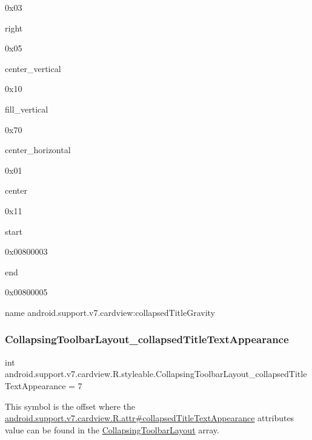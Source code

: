 0x03

{\ttfamily right}

0x05

{\ttfamily center\+\_\+vertical}

0x10

{\ttfamily fill\+\_\+vertical}

0x70

{\ttfamily center\+\_\+horizontal}

0x01

{\ttfamily center}

0x11

{\ttfamily start}

0x00800003

{\ttfamily end}

0x00800005

name android.\+support.\+v7.\+cardview\+:collapsed\+Title\+Gravity \mbox{\label{classandroid_1_1support_1_1v7_1_1cardview_1_1R_1_1styleable_ad3a48e5593ffa8db03af733e76a429f2}} 
\subsubsection{\texorpdfstring{Collapsing\+Toolbar\+Layout\+\_\+collapsed\+Title\+Text\+Appearance}{CollapsingToolbarLayout\_collapsedTitleTextAppearance}}
{\footnotesize\ttfamily int android.\+support.\+v7.\+cardview.\+R.\+styleable.\+Collapsing\+Toolbar\+Layout\+\_\+collapsed\+Title\+Text\+Appearance = 7\hspace{0.3cm}{\ttfamily [static]}}

This symbol is the offset where the \hyperlink{classandroid_1_1support_1_1v7_1_1cardview_1_1R_1_1attr_a6badac0213756c6bf93f7cef451007a2}{android.\+support.\+v7.\+cardview.\+R.\+attr\#collapsed\+Title\+Text\+Appearance} attribute\textquotesingle{}s value can be found in the \hyperlink{classandroid_1_1support_1_1v7_1_1cardview_1_1R_1_1styleable_a3b4c5393d0c99cb4e5a7a3911fc606b4}{Collapsing\+Toolbar\+Layout} array.

